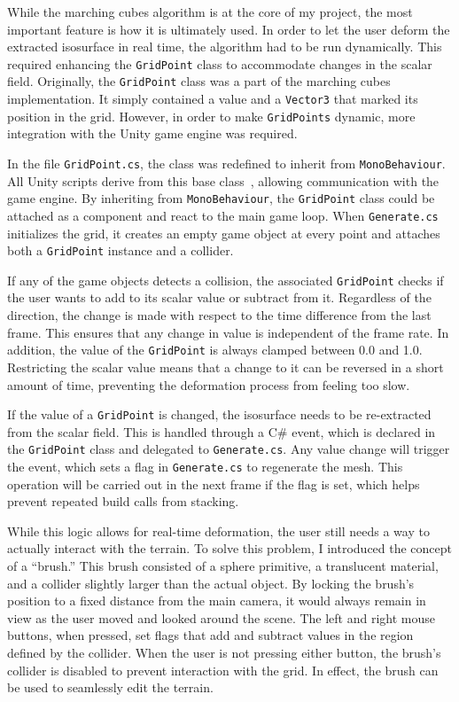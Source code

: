 \documentclass[pageno]{jpaper}
\begin{document}
While the marching cubes algorithm is at the core of my project, the most important feature is how it is ultimately used. In order to let the user deform the extracted isosurface in real time, the algorithm had to be run dynamically. This required enhancing the \texttt{GridPoint} class to accommodate changes in the scalar field. Originally, the \texttt{GridPoint} class was a part of the marching cubes implementation. It simply contained a value and a \texttt{Vector3} that marked its position in the grid. However, in order to make \texttt{GridPoints} dynamic, more integration with the Unity game engine was required. 

In the file \texttt{GridPoint.cs}, the class was redefined to inherit from \texttt{MonoBehaviour}. All Unity scripts derive from this base class~\cite{unitymono}, allowing communication with the game engine. By inheriting from \texttt{MonoBehaviour}, the \texttt{GridPoint} class could be attached as a component and react to the main game loop. When \texttt{Generate.cs} initializes the grid, it creates an empty game object at every point and attaches both a \texttt{GridPoint} instance and a collider. 

If any of the game objects detects a collision, the associated \texttt{GridPoint} checks if the user wants to add to its scalar value or subtract from it. Regardless of the direction, the change is made with respect to the time difference from the last frame. This ensures that any change in value is independent of the frame rate. In addition, the value of the \texttt{GridPoint} is always clamped between 0.0 and 1.0. Restricting the scalar value means that a change to it can be reversed in a short amount of time, preventing the deformation process from feeling too slow.

If the value of a \texttt{GridPoint} is changed, the isosurface needs to be re-extracted from the scalar field. This is handled through a C\# event, which is declared in the \texttt{GridPoint} class and delegated to \texttt{Generate.cs}. Any value change will trigger the event, which sets a flag in \texttt{Generate.cs} to regenerate the mesh. This operation will be carried out in the next frame if the flag is set, which helps prevent repeated build calls from stacking.

While this logic allows for real-time deformation, the user still needs a way to actually interact with the terrain. To solve this problem, I introduced the concept of a “brush.” This brush consisted of a sphere primitive, a translucent material, and a collider slightly larger than the actual object. By locking the brush's position to a fixed distance from the main camera, it would always remain in view as the user moved and looked around the scene. The left and right mouse buttons, when pressed, set flags that add and subtract values in the region defined by the collider. When the user is not pressing either button, the brush's collider is disabled to prevent interaction with the grid. In effect, the brush can be used to seamlessly edit the terrain.
\end{document}
